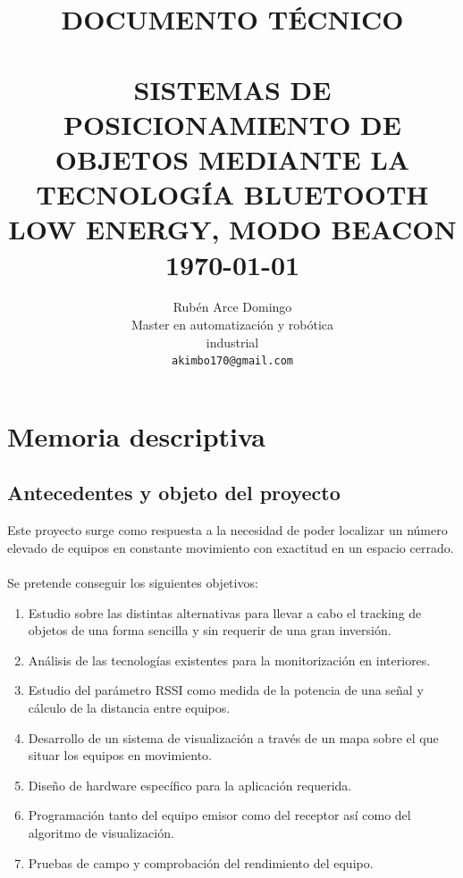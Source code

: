 \documentclass[paper=a4, fontsize=11pt,twoside]{scrartcl}	%
\title{	\normalsize \textsc{DOCUMENTO TÉCNICO} 	%
		 	\\[2.0cm]								%
             \HRule{0.5pt} \\						%
             \LARGE \textbf{\uppercase{Sistemas de posicionamiento de objetos mediante la tecnología Bluetooth Low Energy, modo Beacon}}	%
			\HRule{2pt} \\ [0.5cm]		%
			\normalsize \today			%
		}
\author{
    Rubén Arce Domingo\\	
		Master en automatización y robótica\\	
		industrial\\
        \texttt{akimbo170@gmail.com} \\
}
\makeatletter
\def\printtitle{%
{\centering \@title\par}}
\def\printauthor{%
{\centering \large \@author}}
\makeatother
\begin{document}
\thispagestyle{empty}		%
\printtitle					%
  	\vfill
\printauthor				%
\newpage


\cleardoublepage
\tableofcontents
\listoffigures
\cleardoublepage
\pagestyle{fancy}




\section{Memoria descriptiva}
    \subsection{Antecedentes y objeto del proyecto}
        Este proyecto surge como respuesta a la necesidad de poder localizar un número elevado de equipos en 
        constante movimiento con exactitud en un espacio cerrado.
        \paragraph{}
        Se pretende conseguir los siguientes objetivos:
        \begin{enumerate}
            \item Estudio sobre las distintas alternativas para llevar a cabo el tracking de objetos de una forma
            sencilla y sin requerir de una gran inversión.
            \item Análisis de las tecnologías existentes para la monitorización en interiores.
            \item Estudio del parámetro RSSI como medida de la potencia de una señal y cálculo de la distancia entre equipos.
            \item Desarrollo de un sistema de visualización a través de un mapa sobre el que situar los equipos en movimiento.
            \item Diseño de hardware específico para la aplicación requerida.
            \item Programación tanto del equipo emisor como del receptor así como del algoritmo de visualización.
            \item Pruebas de campo y comprobación del rendimiento del equipo.
        \end{enumerate}
\end{document}
